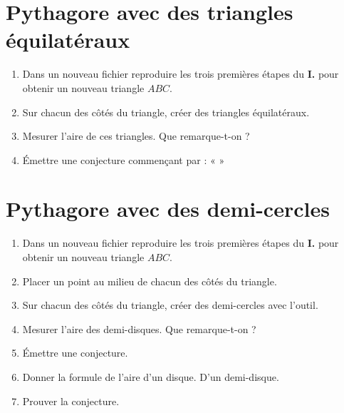 \section{Pythagore avec des triangles équilatéraux}

\begin{enumerate}
    \item Dans un nouveau fichier \GeoGebra \def\iconPath{geogebra/} reproduire les trois premières étapes du \textbf{\color{Red}I.} pour obtenir un nouveau triangle $ABC$.
    \item Sur chacun des côtés du triangle, créer des triangles équilatéraux.\\
    \item Mesurer l'aire de ces triangles. Que remarque-t-on ?\\
    \item Émettre une conjecture commençant par :
    «
    »
\end{enumerate}

\section{Pythagore avec des demi-cercles}

\begin{enumerate}
    \item Dans un nouveau fichier \GeoGebra \def\iconPath{geogebra/} reproduire les trois premières étapes du \textbf{\color{Red}I.} pour obtenir un nouveau triangle $ABC$.
    \item Placer un point au milieu de chacun des côtés du triangle.\\
    \item Sur chacun des côtés du triangle, créer des demi-cercles avec l'outil.\\
    \item Mesurer l'aire des demi-disques. Que remarque-t-on ?
    \item Émettre une conjecture.
    \item Donner la formule de l'aire d'un disque. D'un demi-disque.
    \item Prouver la conjecture.\\
\end{enumerate}
